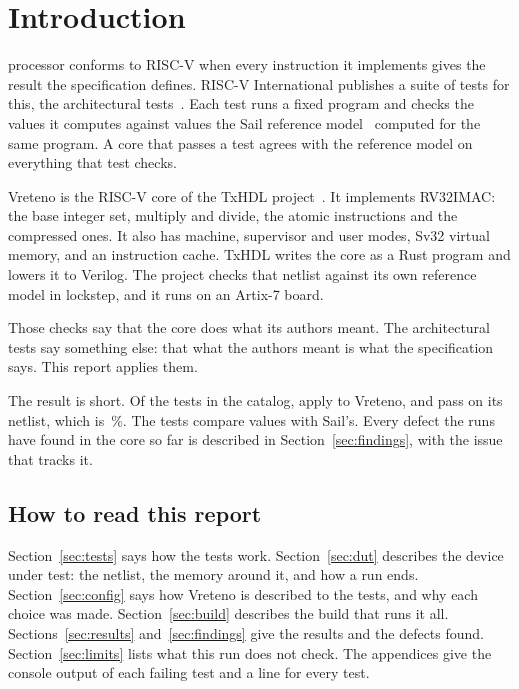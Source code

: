 \section{Introduction}
\label{sec:intro}

 processor conforms to RISC-V when every
instruction it implements gives the result the specification defines.
RISC-V International publishes a suite of tests for this, the
architectural tests~\cite{act}. Each test runs a fixed program and
checks the values it computes against values the Sail reference
model~\cite{sail} computed for the same program. A core that passes a
test agrees with the reference model on everything that test checks.

Vreteno is the RISC-V core of the TxHDL project~\cite{txhdl}. It
implements RV32IMAC: the base integer set, multiply and divide, the
atomic instructions and the compressed ones. It also has machine,
supervisor and user modes, Sv32 virtual memory, and an instruction
cache. TxHDL writes the core as a Rust program and lowers it to
Verilog. The project checks that netlist against its own reference
model in lockstep, and it runs on an Artix-7 board.

Those checks say that the core does what its authors meant. The
architectural tests say something else: that what the authors meant is
what the specification says. This report applies them.

The result is short. Of the \NCatalog{} tests in the catalog,
\NTests{} apply to Vreteno, and \NRtlPass{} pass on its netlist, which
is \PassPercent{}\,\%. The tests compare \NChecks{} values with Sail's.
Every defect the runs have found in the core so far is described in
Section~\ref{sec:findings}, with the issue that tracks it.

\subsection{How to read this report}

Section~\ref{sec:tests} says how the tests work.
Section~\ref{sec:dut} describes the device under test: the netlist, the
memory around it, and how a run ends.
Section~\ref{sec:config} says how Vreteno is described to the tests,
and why each choice was made.
Section~\ref{sec:build} describes the build that runs it all.
Sections~\ref{sec:results} and~\ref{sec:findings} give the results and
the defects found.
Section~\ref{sec:limits} lists what this run does not check.
The appendices give the console output of each failing test and a line
for every test.
